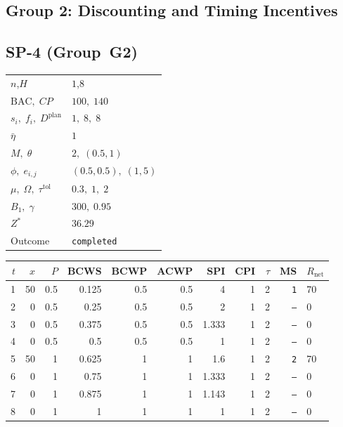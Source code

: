\documentclass[12pt, a4paper]{article}
\newcommand{\BAC}{\mathrm{BAC}}
\begin{document}
\newpage


\subsection*{Group 2: Discounting and Timing Incentives}

\subsection*{SP-4  (Group~G2)}
\begin{center}
\begin{tabular}{ll}
\toprule
$n$,\;$H$ & $1$,\;$8$ \\
$\BAC,\;CP$ & $100,\;140$ \\
$s_i,\;f_i,\;D^{\mathrm{plan}}$ & $1,\;8,\;8$ \\
$\bar\eta$ & $1$ \\
$M,\;\theta$ & $2,\;(0.5,1)$ \\
$\phi,\;e_{i,j}$ & $(0.5,0.5),\;(1,5)$ \\
$\mu,\;\Omega,\;\tau^{\mathrm{tol}}$ & $0.3,\;1,\;2$ \\
$B_1,\;\gamma$ & $300,\;0.95$ \\
$Z^*$ & $36.29$ \\
Outcome & \texttt{completed} \\
\bottomrule
\end{tabular}
\end{center}

\begin{center}
\begin{tabular}{rrrrrrrrrrl}
\toprule
$t$ & $x$ & $P$ & BCWS & BCWP & ACWP & SPI & CPI & $\tau$ & MS & $R_{\mathrm{net}}$\\
\midrule
1 & 50 & 0.5 & 0.125 & 0.5 & 0.5 & 4 & 1 & 2 & \texttt{1} & 70 \\
2 & 0 & 0.5 & 0.25 & 0.5 & 0.5 & 2 & 1 & 2 & \texttt{---} & 0 \\
3 & 0 & 0.5 & 0.375 & 0.5 & 0.5 & 1.333 & 1 & 2 & \texttt{---} & 0 \\
4 & 0 & 0.5 & 0.5 & 0.5 & 0.5 & 1 & 1 & 2 & \texttt{---} & 0 \\
5 & 50 & 1 & 0.625 & 1 & 1 & 1.6 & 1 & 2 & \texttt{2} & 70 \\
6 & 0 & 1 & 0.75 & 1 & 1 & 1.333 & 1 & 2 & \texttt{---} & 0 \\
7 & 0 & 1 & 0.875 & 1 & 1 & 1.143 & 1 & 2 & \texttt{---} & 0 \\
8 & 0 & 1 & 1 & 1 & 1 & 1 & 1 & 2 & \texttt{---} & 0 \\
\bottomrule
\end{tabular}
\end{center}
\end{document}
